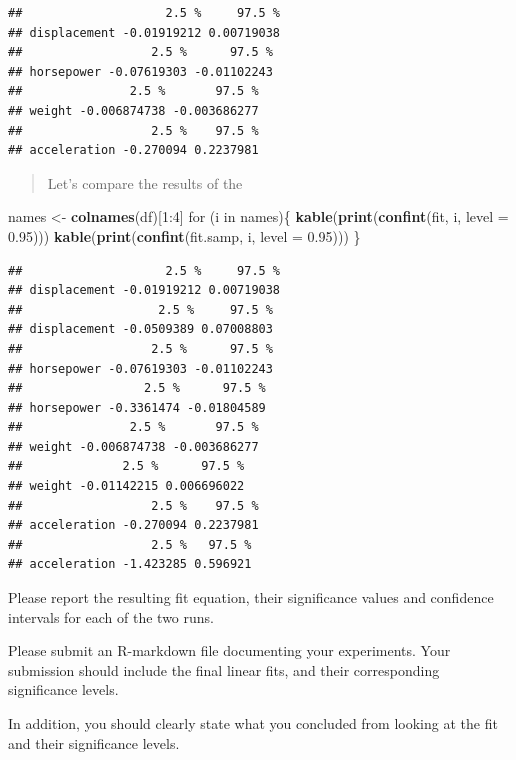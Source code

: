 \documentclass[]{article}
\newenvironment{Shaded}{\begin{snugshade}}{\end{snugshade}}
\newcommand{\KeywordTok}[1]{\textcolor[rgb]{0.13,0.29,0.53}{\textbf{{#1}}}}
\newcommand{\DataTypeTok}[1]{\textcolor[rgb]{0.13,0.29,0.53}{{#1}}}
\newcommand{\DecValTok}[1]{\textcolor[rgb]{0.00,0.00,0.81}{{#1}}}
\newcommand{\FloatTok}[1]{\textcolor[rgb]{0.00,0.00,0.81}{{#1}}}
\newcommand{\StringTok}[1]{\textcolor[rgb]{0.31,0.60,0.02}{{#1}}}
\newcommand{\NormalTok}[1]{{#1}}
\begin{document}
\begin{verbatim}
##                    2.5 %     97.5 %
## displacement -0.01919212 0.00719038
##                  2.5 %      97.5 %
## horsepower -0.07619303 -0.01102243
##               2.5 %       97.5 %
## weight -0.006874738 -0.003686277
##                  2.5 %    97.5 %
## acceleration -0.270094 0.2237981
\end{verbatim}

\begin{quote}
Let's compare the results of the
\end{quote}

\begin{Shaded}
\begin{Highlighting}[]
\NormalTok{names <-}\StringTok{ }\KeywordTok{colnames}\NormalTok{(df)[}\DecValTok{1}\NormalTok{:}\DecValTok{4}\NormalTok{]}
\NormalTok{for (i in names)\{}
\KeywordTok{kable}\NormalTok{(}\KeywordTok{print}\NormalTok{(}\KeywordTok{confint}\NormalTok{(fit, i, }\DataTypeTok{level =} \FloatTok{0.95}\NormalTok{)))}
\KeywordTok{kable}\NormalTok{(}\KeywordTok{print}\NormalTok{(}\KeywordTok{confint}\NormalTok{(fit.samp, i, }\DataTypeTok{level =} \FloatTok{0.95}\NormalTok{)))}
\NormalTok{\}}
\end{Highlighting}
\end{Shaded}

\begin{verbatim}
##                    2.5 %     97.5 %
## displacement -0.01919212 0.00719038
##                   2.5 %     97.5 %
## displacement -0.0509389 0.07008803
##                  2.5 %      97.5 %
## horsepower -0.07619303 -0.01102243
##                 2.5 %      97.5 %
## horsepower -0.3361474 -0.01804589
##               2.5 %       97.5 %
## weight -0.006874738 -0.003686277
##              2.5 %      97.5 %
## weight -0.01142215 0.006696022
##                  2.5 %    97.5 %
## acceleration -0.270094 0.2237981
##                  2.5 %   97.5 %
## acceleration -1.423285 0.596921
\end{verbatim}

Please report the resulting fit equation, their significance values and
confidence intervals for each of the two runs.

Please submit an R-markdown file documenting your experiments. Your
submission should include the final linear fits, and their corresponding
significance levels.

In addition, you should clearly state what you concluded from looking at
the fit and their significance levels.
\end{document}
